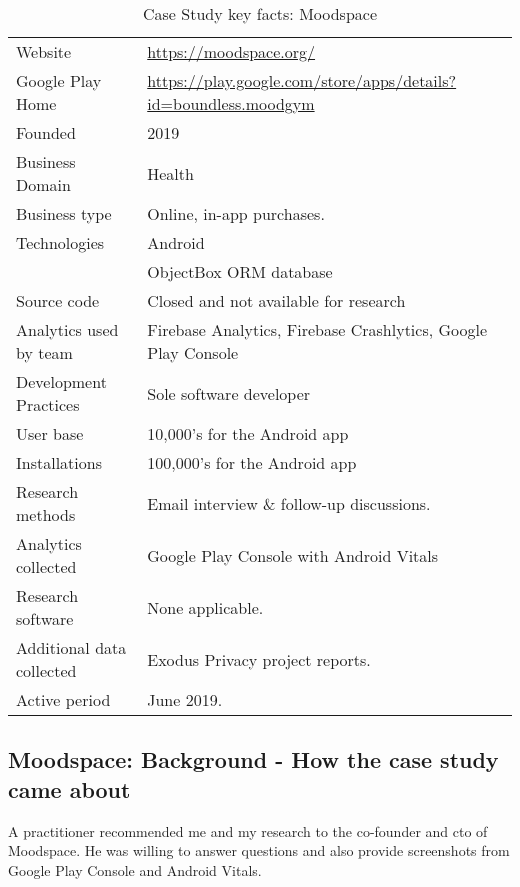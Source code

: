 {\renewcommand{\arraystretch}{0.8}%
\begin{table*}
    \centering
    \small
    \setlength{\tabcolsep}{6pt}
    \begin{tabular}{lp{9cm}}
       \toprule
       Website &\url{https://moodspace.org/} \\
       Google Play Home & \url{https://play.google.com/store/apps/details?id=boundless.moodgym} \\
       Founded & 2019 \\
       Business Domain & Health \\
       Business type & Online, in-app purchases. \\
       Technologies  & Android \\
       & ObjectBox ORM database \\
       Source code  &Closed and not available for research \\
       Analytics used by team & Firebase Analytics, Firebase Crashlytics, Google Play Console \\
       Development Practices & Sole software developer \\
       \midrule
       User base & 10,000's for the Android app \\
       Installations & 100,000's for the Android app \\
       \midrule
       Research methods &Email interview \& follow-up discussions. \\
       Analytics collected &Google Play Console with Android Vitals \\
       Research software & None applicable. \\
       Additional data collected &Exodus Privacy project reports. \\
       Active period & June 2019. \\
       \bottomrule
    \end{tabular}
    \caption{Case Study key facts: Moodspace}
    \label{tab:moodspace_case_study_anaytics_overview}
\end{table*}
}

\subsection{Moodspace: Background - How the case study came about}
A practitioner recommended me and my research to the co-founder and \acrshort{cto} of Moodspace. He was willing to answer questions and also provide screenshots from Google Play Console and Android Vitals.


